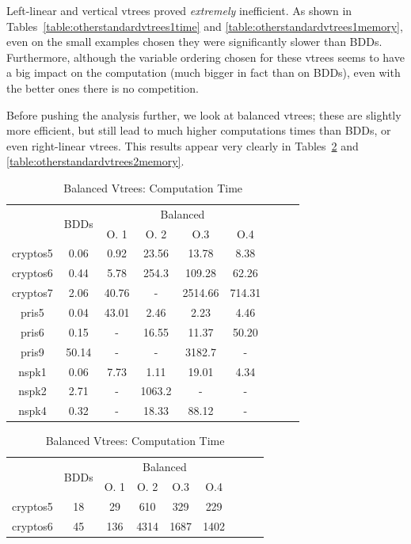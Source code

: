 \documentclass[11pt]{report}
\begin{document}
Left-linear and vertical vtrees proved \textit{extremely} inefficient. As shown in Tables~\ref{table:otherstandardvtrees1time} and \ref{table:otherstandardvtrees1memory}, even on the small examples chosen they were significantly slower than BDDs. Furthermore, although the variable ordering chosen for these vtrees seems to have a big impact on the computation (much bigger in fact than on BDDs), even with the better ones there is no competition.  

Before pushing the analysis further, we look at balanced vtrees; these are slightly more efficient, but still lead to much higher computations times than BDDs, or even right-linear vtrees. This results appear very clearly in Tables~\ref{table:otherstandardvtrees2time} and \ref{table:otherstandardvtrees2memory}.
\label{balanced_comparisons}
\begin{table}
\centering
\begin{tabular}{|*{9}{c|}}
\hline
 & \multirow{2}{*}{BDDs} & \multicolumn{4}{c|}{Balanced} \\ \cline{3-6}
 & & O. 1& O. 2 & O.3 & O.4 \\ \hline
cryptos5 & 0.06& 0.92 & 23.56 & 13.78 & 8.38\\ \hline
cryptos6 & 0.44 & 5.78 & 254.3& 109.28 & 62.26\\ \hline
cryptos7 & 2.06& 40.76 & - & 2514.66 & 714.31 \\ \hline
pris5 & 0.04 & 43.01 & 2.46& 2.23 & 4.46 \\ \hline
pris6 & 0.15 & - & 16.55 & 11.37 & 50.20 \\ \hline
pris9 & 50.14 & - & - & 3182.7& - \\ \hline
nspk1 &0.06 & 7.73 & 1.11 & 19.01 & 4.34 \\ \hline
nspk2 &2.71 & - & 1063.2 &- & - \\ \hline
nspk4 & 0.32& - & 18.33 & 88.12& -\\ \hline
\end{tabular}
\caption{Balanced Vtrees: Computation Time}
\label{table:otherstandardvtrees2time}
\vspace{1in}
\centering
\begin{tabular}{|*{9}{c|}}
\hline
 & \multirow{2}{*}{BDDs} & \multicolumn{4}{c|}{Balanced} \\ \cline{3-6}
 & & O. 1& O. 2 & O.3 & O.4 \\ \hline
cryptos5 & 18 & 29 & 610 & 329 & 229 \\ \hline
cryptos6 & 45 & 136 & 4314 & 1687 & 1402\\ \hline

\end{tabular}
\end{table}
\end{document}
